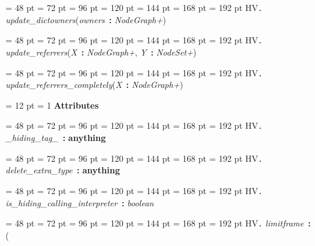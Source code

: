 {{{{\par \noindent  \leftskip = 48 pt  \leftmargini = 72 pt  \leftmarginii = 96 pt  \leftmarginiii = 120 pt  \leftmarginiv = 144 pt  \leftmarginv = 168 pt  \leftmarginvi = 192 pt HV{\large {\tt .\/} {\em update{\_}dictowners\/}}({\em owners\/}~{\bf :}  {\em NodeGraph+\/})\par}
{\par \noindent  \leftskip = 48 pt  \leftmargini = 72 pt  \leftmarginii = 96 pt  \leftmarginiii = 120 pt  \leftmarginiv = 144 pt  \leftmarginv = 168 pt  \leftmarginvi = 192 pt HV{\large {\tt .\/} {\em update{\_}referrers\/}}({\em X\/}~{\bf :}  {\em NodeGraph+\/}, {\em Y\/}~{\bf :}  {\em NodeSet+\/})\par}
{\par \noindent  \leftskip = 48 pt  \leftmargini = 72 pt  \leftmarginii = 96 pt  \leftmarginiii = 120 pt  \leftmarginiv = 144 pt  \leftmarginv = 168 pt  \leftmarginvi = 192 pt HV{\large {\tt .\/} {\em update{\_}referrers{\_}completely\/}}({\em X\/}~{\bf :}  {\em NodeGraph+\/})\par}
{\par \pagebreak[3.200000] \noindent \hangindent = 12 pt \hangafter = 1 
{\bf {\large {\bf Attributes\/}}\/}\par}
{\par \noindent  \leftskip = 48 pt  \leftmargini = 72 pt  \leftmarginii = 96 pt  \leftmarginiii = 120 pt  \leftmarginiv = 144 pt  \leftmarginv = 168 pt  \leftmarginvi = 192 pt HV{\large {\tt .\/} {\em {\_}hiding{\_}tag{\_}\/}}~{\bf :} {\bf  anything\/}\par}
{\par \noindent  \leftskip = 48 pt  \leftmargini = 72 pt  \leftmarginii = 96 pt  \leftmarginiii = 120 pt  \leftmarginiv = 144 pt  \leftmarginv = 168 pt  \leftmarginvi = 192 pt HV{\large {\tt .\/} {\em delete{\_}extra{\_}type\/}}~{\bf :} {\bf  anything\/}\par}
{\par \noindent  \leftskip = 48 pt  \leftmargini = 72 pt  \leftmarginii = 96 pt  \leftmarginiii = 120 pt  \leftmarginiv = 144 pt  \leftmarginv = 168 pt  \leftmarginvi = 192 pt HV{\large {\tt .\/} {\em is{\_}hiding{\_}calling{\_}interpreter\/}}~{\bf :}  {\em boolean\/}\par}
{\par \noindent  \leftskip = 48 pt  \leftmargini = 72 pt  \leftmarginii = 96 pt  \leftmarginiii = 120 pt  \leftmarginiv = 144 pt  \leftmarginv = 168 pt  \leftmarginvi = 192 pt HV{\large {\tt .\/} {\em limitframe\/}}~{\bf :}  ({\par \noindent
}}}}}
